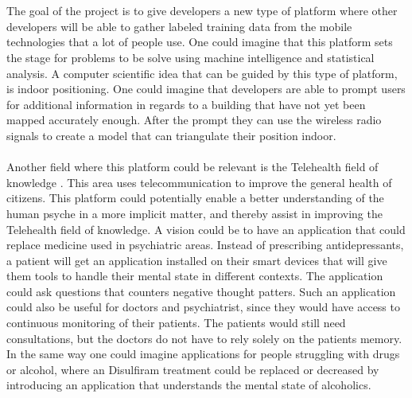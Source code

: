 \\\\
The goal of the project is to give developers a new type of platform where other developers will  be able to gather labeled training data from the mobile technologies that a lot of people use. One could imagine that this platform sets the stage for problems to be solve using machine intelligence and statistical analysis. A computer scientific idea that can be guided by this type of platform, is indoor positioning. One could imagine that developers are able to prompt users for additional information in regards to a building that have not yet been mapped accurately enough. After the prompt they can use the wireless radio signals to create a model that can triangulate their position indoor. 
\\\\
Another field where this platform could be relevant is the Telehealth field of knowledge \parencite{telehealth_aau}. This area uses telecommunication to improve the general health of citizens. This platform could potentially enable a better understanding of the human psyche in a more implicit matter, and thereby assist in improving the Telehealth field of knowledge. A vision could be to have an application that could replace medicine used in psychiatric areas. Instead of prescribing antidepressants, a patient will get an application installed on their smart devices that will give them tools to handle their mental state in different contexts. The application could ask questions that counters negative thought patters. Such an application could also be useful for doctors and psychiatrist, since they would have access to continuous monitoring of their patients. The patients would still need consultations, but the doctors do not have to rely solely on the patients memory. In the same way one could imagine applications for people struggling with drugs or alcohol, where an Disulfiram treatment could be replaced or decreased by introducing an application that understands the mental state of alcoholics.


